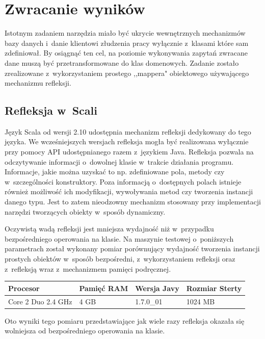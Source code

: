 \documentclass{xmgr}
\begin{document}
\section{Zwracanie wyników}

Istotnym zadaniem narzędzia miało być ukrycie wewnętrznych mechanizmów bazy danych i~danie klientowi złudzenia pracy wyłącznie z~klasami które sam zdefiniował. By osiągnąć ten cel, na poziomie wykonywania zapytań zwracane dane muszą być przetransformowane do klas domenowych. Zadanie zostało zrealizowane z~wykorzystaniem prostego ,,mappera" obiektowego używającego mechanizmu refleksji.

\subsection{Refleksja w~Scali}

Język Scala od wersji 2.10 udostępnia mechanizm refleksji dedykowany do tego języka\cite{scalareflection}. We wcześniejszych wersjach refleksja mogła być realizowana wyłącznie przy pomocy API udostępnianego razem z~językiem Java. Refleksja pozwala na odczytywanie informacji o~dowolnej klasie w~trakcie działania programu. Informacje, jakie można uzyskać to np. zdefiniowane pola, metody czy w~szczególności konstruktory. Poza informacją o~dostępnych polach istnieje również możliwość ich modyfikacji, wywoływania metod czy tworzenia instancji danego typu. Jest to zatem nieodzowny mechanizm stosowany przy implementacji narzędzi tworzących obiekty w~sposób dynamiczny.

Oczywistą wadą refleksji jest mniejsza wydajność niż w~przypadku bezpośredniego operowania na klasie. Na maszynie testowej o~poniższych parametrach został wykonany pomiar porównujący wydajność tworzenia instancji prostych obiektów w~sposób bezpośredni, z~wykorzystaniem refleksji oraz z~refleksją wraz z~mechanizmem pamięci podręcznej.

\begin{tabular}{|l|l|l|l|}
  \hline 
  \textbf{Procesor} & \textbf{Pamięć RAM} & \textbf{Wersja Javy} & \textbf{Rozmiar Sterty} \\
  \hline
  Core 2 Duo 2.4 GHz & 4 GB & 1.7.0\_01 & 1024 MB \\
  \hline
\end{tabular} 

\newpage
Oto wyniki tego pomiaru przedstawiające jak wiele razy refleksja okazała się wolniejsza od bezpośredniego operowania na klasie.
\end{document}
